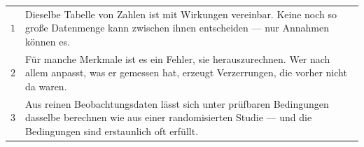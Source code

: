 \begin{merksatz}
\begin{center}
{\small
\renewcommand{\arraystretch}{1.55}
\begin{tabular}{@{}P{1.0cm}P{7.4cm}@{}}
\toprule
$1$ & Dieselbe Tabelle von Zahlen ist mit  Wirkungen vereinbar. Keine noch so große Datenmenge kann zwischen ihnen entscheiden --- nur Annahmen können es. \\
$2$ & Für manche Merkmale ist es ein Fehler, sie herauszurechnen. Wer nach allem anpasst, was er gemessen hat, erzeugt Verzerrungen, die vorher nicht da waren. \\
$3$ & Aus reinen Beobachtungsdaten lässt sich unter prüfbaren Bedingungen dasselbe berechnen wie aus einer randomisierten Studie --- und die Bedingungen sind erstaunlich oft erfüllt. \\
\bottomrule
\end{tabular}}
\end{center}

\begin{center}
\begin{minipage}{0.88\textwidth}
\end{minipage}
\end{center}
\end{merksatz}

